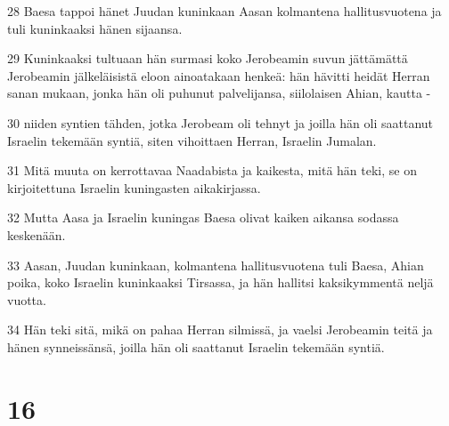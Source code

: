 \par 28 Baesa tappoi hänet Juudan kuninkaan Aasan kolmantena hallitusvuotena ja tuli kuninkaaksi hänen sijaansa.
\par 29 Kuninkaaksi tultuaan hän surmasi koko Jerobeamin suvun jättämättä Jerobeamin jälkeläisistä eloon ainoatakaan henkeä: hän hävitti heidät Herran sanan mukaan, jonka hän oli puhunut palvelijansa, siilolaisen Ahian, kautta -
\par 30 niiden syntien tähden, jotka Jerobeam oli tehnyt ja joilla hän oli saattanut Israelin tekemään syntiä, siten vihoittaen Herran, Israelin Jumalan.
\par 31 Mitä muuta on kerrottavaa Naadabista ja kaikesta, mitä hän teki, se on kirjoitettuna Israelin kuningasten aikakirjassa.
\par 32 Mutta Aasa ja Israelin kuningas Baesa olivat kaiken aikansa sodassa keskenään.
\par 33 Aasan, Juudan kuninkaan, kolmantena hallitusvuotena tuli Baesa, Ahian poika, koko Israelin kuninkaaksi Tirsassa, ja hän hallitsi kaksikymmentä neljä vuotta.
\par 34 Hän teki sitä, mikä on pahaa Herran silmissä, ja vaelsi Jerobeamin teitä ja hänen synneissänsä, joilla hän oli saattanut Israelin tekemään syntiä.

\chapter{16}

